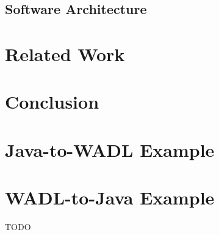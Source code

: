 \documentclass[a4paper,12pt]{article}
\begin{document}
\subsection{Software Architecture}


\section{Related Work}


\section{Conclusion}


\newpage

\appendix

\section{Java-to-WADL Example}


\newpage

\section{WADL-to-Java Example}

TODO

\newpage


\end{document}
